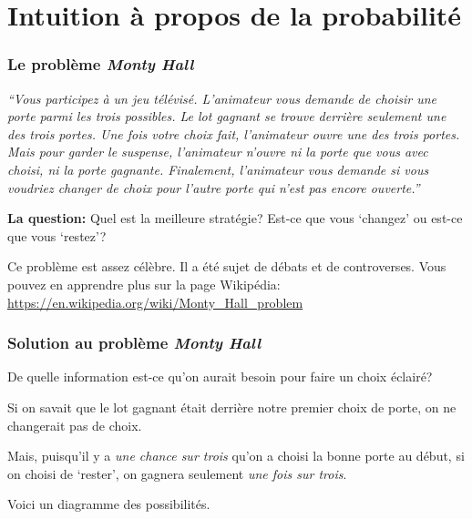 \documentclass{beamer}
\begin{document}

\section{Intuition à propos de la probabilité}


\begin{frame}
    \frametitle{Le problème \emph{Monty Hall}}
    \emph{
    ``Vous participez à un jeu télévisé.
    L’animateur vous demande de choisir une porte parmi les trois possibles.
    Le lot gagnant se trouve derrière seulement une des trois portes.
    Une fois votre choix fait, l’animateur ouvre une des trois portes.
    Mais pour garder le suspense, l’animateur n’ouvre ni la porte que
    vous avec choisi, ni la porte gagnante.
    Finalement, l’animateur vous demande si vous voudriez changer de choix
    pour l’autre porte qui n’est pas encore ouverte.''}\\

    \bigskip \pause

    \textbf{La question:} Quel est la meilleure stratégie?
    Est-ce que vous ‘changez’ ou est-ce que vous ‘restez’?\\

    \bigskip \pause

    Ce problème est assez célèbre. Il a été sujet de débats et de controverses.
    Vous pouvez en apprendre plus sur la page Wikipédia:
    \url{https://en.wikipedia.org/wiki/Monty_Hall_problem}
\end{frame}


\begin{frame}
    \frametitle{Solution au problème \emph{Monty Hall}}
    De quelle information est-ce qu’on aurait besoin pour faire un choix éclairé?\\

    \bigskip \pause

    Si on savait que le lot gagnant était derrière notre premier choix de porte,
    on ne changerait pas de choix.\\ %

    \bigskip \pause

    Mais, puisqu’il y a \emph{une chance sur trois} qu’on a choisi la bonne porte au début,
    si on choisi de ‘rester’, on gagnera seulement \emph{une fois sur trois}.\\

    \bigskip \pause

    Voici un diagramme des possibilités.
\end{frame}
\end{document}
